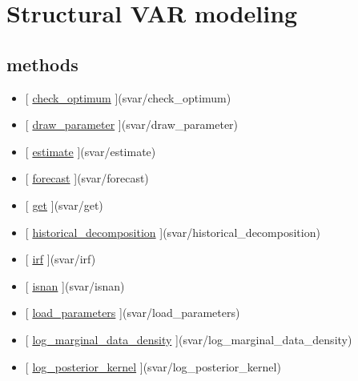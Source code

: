 \documentclass[letterpaper,10pt,english]{sphinxmanual}
\begin{document}
\chapter{Structural VAR modeling}
\label{classes/models/@svar/svar:structural-var-modeling}\label{classes/models/@svar/svar::doc}

\section{methods}
\label{classes/models/@svar/svar:methods}\begin{itemize}
\item {} 
{[} {\hyperref[classes/models/@svar/svar:check-optimum]{check\_optimum}} {]}(svar/check\_optimum)

\item {} 
{[} {\hyperref[classes/models/@svar/svar:draw-parameter]{draw\_parameter}} {]}(svar/draw\_parameter)

\item {} 
{[} {\hyperref[classes/models/@svar/svar:estimate]{estimate}} {]}(svar/estimate)

\item {} 
{[} {\hyperref[classes/models/@svar/svar:forecast]{forecast}} {]}(svar/forecast)

\item {} 
{[} {\hyperref[classes/models/@svar/svar:get]{get}} {]}(svar/get)

\item {} 
{[} {\hyperref[classes/models/@svar/svar:historical-decomposition]{historical\_decomposition}} {]}(svar/historical\_decomposition)

\item {} 
{[} {\hyperref[classes/models/@svar/svar:irf]{irf}} {]}(svar/irf)

\item {} 
{[} {\hyperref[classes/models/@svar/svar:isnan]{isnan}} {]}(svar/isnan)

\item {} 
{[} {\hyperref[classes/models/@svar/svar:load-parameters]{load\_parameters}} {]}(svar/load\_parameters)

\item {} 
{[} {\hyperref[classes/models/@svar/svar:log-marginal-data-density]{log\_marginal\_data\_density}} {]}(svar/log\_marginal\_data\_density)

\item {} 
{[} {\hyperref[classes/models/@svar/svar:log-posterior-kernel]{log\_posterior\_kernel}} {]}(svar/log\_posterior\_kernel)


\end{itemize}
\end{document}
